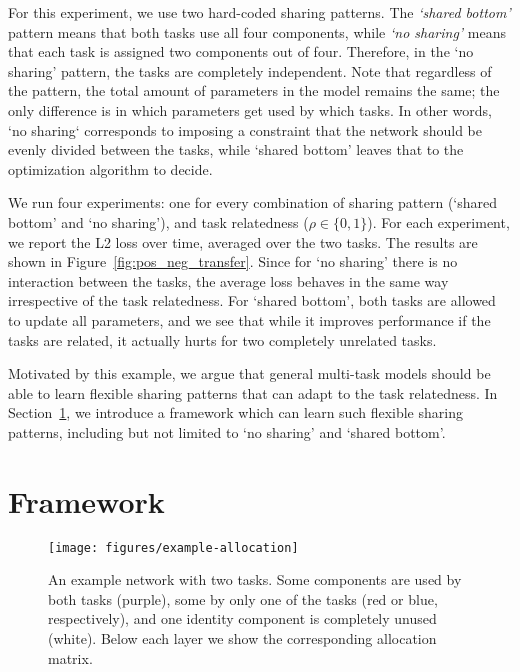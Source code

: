 \documentclass[conference]{IEEEtran}
\begin{document}
For this experiment, we use two hard-coded sharing patterns. The \textit{`shared bottom'} pattern means that both tasks use all four components, while \textit{`no sharing'} means that each task is assigned two components out of four. Therefore, in the `no sharing' pattern, the tasks are completely independent.
Note that regardless of the pattern, the total amount of parameters in the  model remains the same; the only difference is in which parameters get used by which tasks. In other words, `no sharing` corresponds to imposing a constraint that the network should be evenly divided between the tasks, while `shared bottom' leaves that to the optimization algorithm to decide.


We run four experiments: one for every combination of sharing pattern (`shared bottom' and `no sharing'), and task relatedness ($\rho \in \{0, 1\}$). For each experiment, we report the L2 loss over time, averaged over the two tasks. The results are shown in Figure~\ref{fig:pos_neg_transfer}. Since for `no sharing' there is no interaction between the tasks, the average loss behaves in the same way irrespective of the task relatedness. For `shared bottom', both tasks are allowed to update all parameters, and we see that while it improves performance if the tasks are related, it actually hurts for two completely unrelated tasks.

Motivated by this example, we argue that general multi-task models should be able to learn flexible sharing patterns that can adapt to the task relatedness. In Section~\ref{sec:proposed_framework}, we introduce a framework which can learn such flexible sharing patterns, including but not limited to `no sharing' and `shared bottom'.


\section{Framework}\label{sec:proposed_framework}

\begin{figure*}[!t]
\begin{center}
\texttt{[image: figures/example-allocation]}
\end{center}
\caption{An example network with two tasks. Some components are used by both tasks (purple), some by only one of the tasks (red or blue, respectively), and one identity component is completely unused (white). Below each layer we show the corresponding allocation matrix.}\label{fig:routing_model_specific}
\end{figure*}
\end{document}
